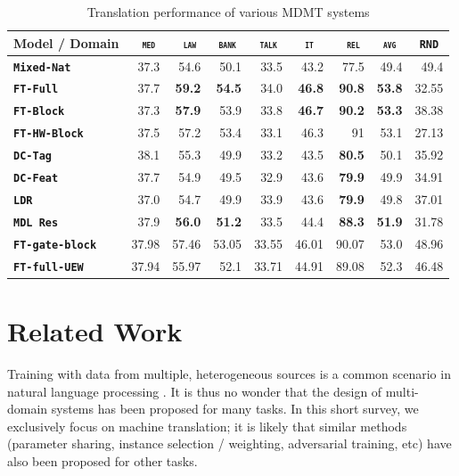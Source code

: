 \documentclass[11pt,a4paper]{article}
\newcommand{\fyDone}[1]{\done[FY]\Todo[FY:]{\textcolor{orange}{#1}}}
\newcommand{\mpDone}[1]{\done[MP]\Todo[MP:]{\textcolor{green}{#1}}}
\newcommand{\domain}[1]{\texttt{\textsc{#1}}}
\newcommand{\system}[1]{\texttt{\textbf{#1}}}
\newcommand{\SB}[1]{\textbf{#1}}
\begin{document}
\begin{table}[htbp]
  \centering
  \fyDone{Fix column size}
  \begin{tabular}{|p{3cm}|*{8}{r|}} \hline
    Model / Domain & \multicolumn{1}{c|}{\domain{ med}} & \multicolumn{1}{c|}{\domain{ law}} & \multicolumn{1}{c|}{\domain{bank}} & \multicolumn{1}{c|}{\domain{talk}} & \multicolumn{1}{c|}{\domain{ it }} & \multicolumn{1}{c|}{\domain{ rel}} & \multicolumn{1}{c|}{\domain{avg}} & \multicolumn{1}{c|}{\domain{RND}} \\ \hline  
    \system{Mixed-Nat}  & 37.3 & 54.6 & 50.1 & 33.5 & 43.2 & 77.5  &  49.4 & 49.4 \\
    \system{FT-Full}       & 37.7 & \SB{59.2} & \SB{54.5} & 34.0 & \SB{46.8} & \SB{90.8} &  \SB{53.8} & 32.55 \\
   \system{FT-Block}     & 37.3 & \SB{57.9} & 53.9 & 33.8 & \SB{46.7} & \SB{90.2}  &  \SB{53.3} & 38.38 \\ \hline 
   \system{FT-HW-Block}   & 37.5 & 57.2 & 53.4 & 33.1 & 46.3 & 91 & 53.1 & 27.13\\ 
    \system{DC-Tag}       & 38.1 & 55.3 & 49.9   & 33.2 & 43.5 & \SB{80.5}  & 50.1 & 35.92   \\
    \system{DC-Feat}      & 37.7  & 54.9 & 49.5   & 32.9 & 43.6 & \SB{79.9} & 49.9 & 34.91 \\
    \system{LDR}            & 37.0   & 54.7 & 49.9 & 33.9 & 43.6 & \SB{79.9} & 49.8          & 37.01 \\
    \system{MDL Res}     & 37.9 & \SB{56.0}  & \SB{51.2}   & 33.5   &  44.4  & \SB{88.3} & \SB{51.9} & 31.78 \\
    \system{FT-gate-block}    & 37.98 &	57.46&	53.05&	33.55&	46.01&	90.07&	53.0&	48.96 \\
    \system{FT-full-UEW} &	37.94 &	55.97 &	52.1 &	33.71 &	44.91 &	89.08 &	52.3 &	46.48 \\
     \hline
  \end{tabular}
  \caption{Translation performance of various MDMT systems}
  \label{tab:performance-random}
\end{table}

\section{Related Work \label{sec:related}}
\mpDone{related work}

Training with data from multiple, heterogeneous sources is a common scenario in natural language processing \cite{Dredze08online,Finkel09hierarchical}. It is thus no wonder that the design of multi-domain systems has been proposed for many tasks. In this short survey, we exclusively focus on machine translation; it is likely that similar methods (parameter sharing, instance selection / weighting, adversarial training, etc) have also been proposed for other tasks.
\end{document}
